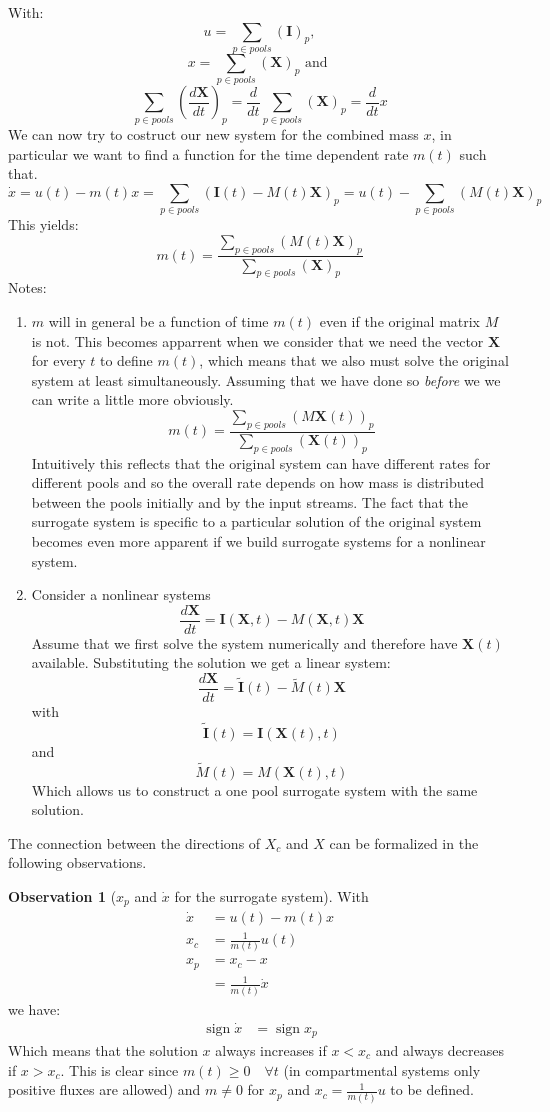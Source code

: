 \documentclass[journal abbreviation, manuscript]{copernicus}
\theoremstyle{definition}
\newtheorem{observation}{Observation}[section]
\newcommand{\X}{\mathbf{X}}
\newcommand{\I}{\mathbf{I}}
\DeclareMathOperator{\sign}{sign}
\begin{document}
With: 
$$
u=\sum_{p \in pools} (\I)_p, 
$$
$$
x = \sum_{p \in pools} (\X)_p
\text{ and }
$$ 
$$
\sum_{p \in pools} \left( \frac{d \X}{d t} \right)_p
=\frac{d}{d t}\sum_{p \in pools} (\X )_p
=\frac{d}{d t} x
$$
We can now try to costruct our new system for the combined mass $x$, in particular we want to find a function for the time dependent rate $m(t)$ such that. 
$$
\dot{x}
=u(t)-m(t) x 
=\sum_{p \in pools} \left( \I(t) - M(t) \X \right)_p
=u(t)-\sum_{p \in pools} ( M(t) \X )_p
$$
This yields: 
$$
m(t) = \frac{
    \sum_{p \in pools} ( M(t) \X )_p
    }{
    \sum_{p \in pools} (\X)_p
    }
$$
Notes:
\begin{enumerate}
\item 
  $m$ will in general be a function of time $m(t)$ even if the original matrix $M$ is not.
  This becomes apparrent when we consider that we need the vector $\X$ for every $t$ to define $m(t)$, which means that we also must solve the original system at least simultaneously.
  Assuming that we have done so \emph{before} we we can write a little more obviously.
  $$
  m(t) = \frac{
      \sum_{p \in pools} ( M \X(t) )_p
      }{
      \sum_{p \in pools} (\X(t))_p
      }
  $$
  Intuitively this reflects that the original system can have different rates for different pools and so the overall 
  rate depends on how mass is distributed between the pools initially and by the input streams. 
  The fact that the surrogate system is specific to a particular solution of the original system becomes even more apparent
  if we build surrogate systems for a nonlinear system. 
\item
  Consider a nonlinear systems
  $$
  \frac{d \X}{d t}= \I(\X,t) - M(\X,t) \X 
  $$
  Assume that we first solve the system numerically and therefore have $\X(t)$ available.
  Substituting the solution we get a linear system:
  $$
  \frac{d \X}{d t}= \tilde{\I}(t) - \tilde{M}(t) \X 
  $$
  with 
  $$
  \tilde{\I}(t)=\I(\X(t),t)
  $$
  and
  $$
  \tilde{M}(t)=M(\X(t),t)
  $$
  Which allows us to construct a one pool surrogate system with the same solution.
\end{enumerate}

The connection between the directions of $X_c$ and $X$ can be formalized in the following observations.

\begin{observation}[$x_p$ and $\dot{x}$ for the surrogate system]
With
\begin{align*}
\dot{x}   &=   u(t)-m(t)x              \\
x_c       &=   \frac{1}{m(t)} u(t)    \\
x_p       &=   x_c-x                  \\
          &=   \frac{1}{m(t)} \dot{x} 
\end{align*}
we have:
\begin{align}
\label{sign}
\sign \dot{x} &= \sign x_p
\end{align}
Which means that the solution $x$ always increases if $x<x_c$ and always decreases if $x>x_c$.
This is clear since $m(t) \ge 0 \quad \forall t$ (in compartmental systems only positive fluxes are allowed) and $m \ne 0$ for $x_p$ and $x_c=\frac{1}{m(t)} u$ to be defined.
\end{observation}
\end{document}
